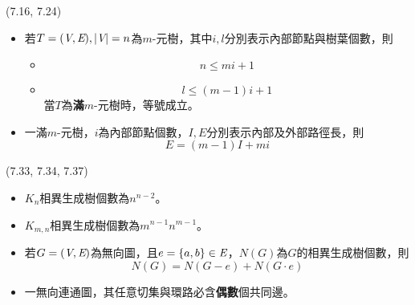 \item \begin{theorem}{(7.16, 7.24)} \quad\quad
    \begin{itemize}
        \item 若$T = (\textit{V}, \textit{E}), |\textit{V}| = n$為$m$-元樹，其中$i, l$分別表示內部節點與樹葉個數，則\begin{itemize}
            \item \begin{equation}
                n \le mi + 1
            \end{equation}
            \item \begin{equation}
                l \le (m - 1)i + 1
            \end{equation}
            當$T$為\textbf{滿}$m$-元樹時，等號成立。
        \end{itemize}
        \item 一滿$m$-元樹，$i$為內部節點個數，$I, E$分別表示內部及外部路徑長，則\begin{equation}
            E = (m - 1)I + mi
        \end{equation}
    \end{itemize}
\end{theorem}

\item \begin{theorem}{(7.33, 7.34, 7.37)} \quad\quad
    \begin{itemize}
        \item $K_n$相異生成樹個數為$n^{n - 2}$。
        \item $K_{m, n}$相異生成樹個數為$m^{n - 1}n^{m - 1}$。
        \item 若$G = (\textit{V}, \textit{E})$為無向圖，且$e = \{a, b\} \in \textit{E}$，$N(G)$為$G$的相異生成樹個數，則\begin{equation}
            N(G) = N(G - e) + N(G \cdot e)
        \end{equation}
        \item 一無向連通圖，其任意切集與環路必含\textbf{偶數}個共同邊。
    \end{itemize}
\end{theorem}
